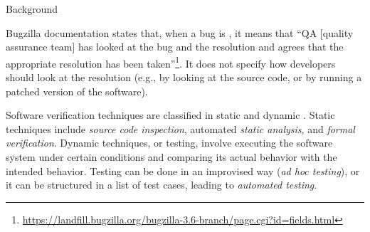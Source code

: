 \begin{section}{Background}

%
Bugzilla documentation states that, when a bug is \VERIFIED, it means that ``QA [quality assurance team] has looked at the bug and the resolution and agrees that the appropriate resolution has been taken''\footnote{\url{https://landfill.bugzilla.org/bugzilla-3.6-branch/page.cgi?id=fields.html}}. It does not specify how developers should look at the resolution (e.g., by looking at the source code, or by running a patched version of the software). 



Software verification techniques are classified in static and dynamic \cite{Sommerville1995}. Static techniques include \emph{source code inspection}, automated \emph{static analysis}, and \emph{formal verification}. Dynamic techniques, or testing, involve executing the software system under certain conditions and comparing its actual behavior with the intended behavior. Testing can be done in an improvised way (\emph{ad hoc testing}), or it can be structured in a list of test cases, leading to \emph{automated testing}.



\end{section}
